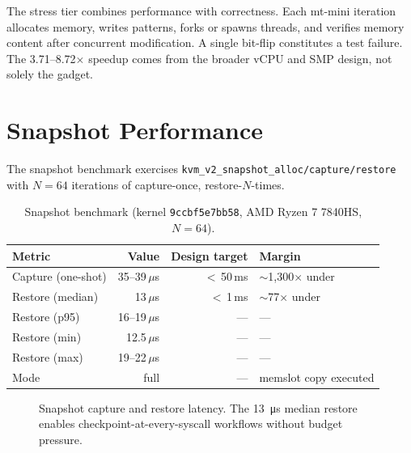 The stress tier combines performance with correctness.  Each mt-mini
iteration allocates memory, writes patterns, forks or spawns threads,
and verifies memory content after concurrent modification.  A single
bit-flip constitutes a test failure.  The 3.71--8.72$\times$ speedup
comes from the broader vCPU and SMP design, not solely the gadget.


\section{Snapshot Performance}
\label{sec:bench-snapshot}

The \KVMvTwo{} snapshot benchmark exercises
\texttt{kvm\_v2\_snapshot\_alloc/capture/restore} with $N=64$
iterations of capture-once, restore-$N$-times.

\begin{table}[htbp]
\centering
\caption{Snapshot benchmark (kernel \texttt{9ccbf5e7bb58}, AMD Ryzen 7 7840HS, $N=64$).}
\label{tab:snapshot-perf}
\begin{tabular}{@{}lrrl@{}}
\toprule
Metric & Value & Design target & Margin \\
\midrule
Capture (one-shot)       & 35--39\,$\mu$s  & $<$\,50\,ms  & $\sim$1,300$\times$ under \\
Restore (median)         & 13\,$\mu$s      & $<$\,1\,ms   & $\sim$77$\times$ under \\
Restore (p95)            & 16--19\,$\mu$s  & ---           & --- \\
Restore (min)            & 12.5\,$\mu$s    & ---           & --- \\
Restore (max)            & 19--22\,$\mu$s  & ---           & --- \\
Mode                     & full            & ---           & memslot copy executed \\
\bottomrule
\end{tabular}
\end{table}

\begin{figure}[htbp]
\centering
{}
\caption{Snapshot capture and restore latency.  The \SI{13}{\micro\second}
  median restore enables checkpoint-at-every-syscall workflows without
  budget pressure.}
\label{fig:bench-snapshot}
\end{figure}

